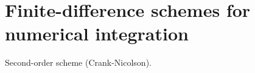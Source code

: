 \documentclass[11pt]{report}
\begin{document}
\chapter{Finite-difference schemes for numerical integration}
Second-order scheme (Crank-Nicolson).
\end{document}
